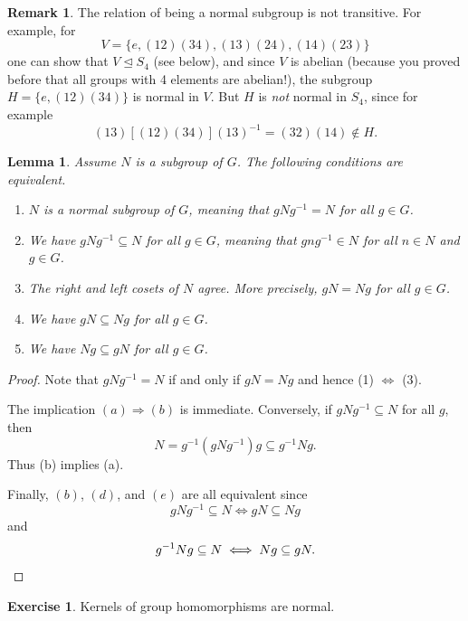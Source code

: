 \documentclass[12pt]{report}
\newtheorem{lemma}[theorem]{Lemma}
\numberwithin{equation}{section}
\numberwithin{theorem}{chapter}
\theoremstyle{definition}
\newtheorem{exercise}{Exercise}
\newtheorem*{basic properties}{Basic Properties}
\newtheorem*{Important Remark}{Important Remark}
\newtheorem{remark}[theorem]{Remark}
\def\norm{\mathrel{\unlhd}}
\begin{document}
\begin{remark}
The relation of being a normal subgroup is not transitive. For example, for 
$$V=\{e, (1 2)(3 4), (1 3)(2 4), (1 4)(2 3)\}$$ 
one can show that $V \norm S_4$ (see  below), and since $V$ is abelian (because you proved before that all groups with 4 elements are abelian!), the subgroup $H = \{e,(12)(34)\}$ is normal in $V$. But $H$ is {\em not} normal in $S_4$, since for example
$$(1 3) [(1 2)(3 4)] (1 3)^{-1} = (3 2)(1 4) \notin H.$$
\end{remark}


\newpage


\begin{lemma}\label{lem925}\label{normal subgroup equivs}
Assume $N$ is a subgroup of $G$. The following conditions are equivalent. 
\begin{enumerate}[label=(\alph*),leftmargin=20pt,itemsep=0.1em]
\item $N$ is a normal subgroup of $G$, meaning that $gNg^{-1} = N$ for all $g \in G$.
\item We have $gNg^{-1} \subseteq N$ for all $g \in G$, meaning that $gng^{-1} \in N$ for all $n \in N$ and $g \in G$.
\item The right and left cosets of $N$ agree. More precisely, $gN = Ng$ for all $g \in G$. 
\item We have $gN \subseteq Ng$ for all $g \in G$.
\item We have $Ng \subseteq gN$ for all $g \in G$.
\end{enumerate}
\end{lemma}



\begin{proof} 
Note that $gNg^{-1} = N$ if and only if $gN = Ng$ and hence (1) $\iff$ (3).
  
The implication $(a) \Rightarrow (b)$ is immediate. Conversely, if $gNg^{-1} \subseteq N$ for all $g$, then 
$$N = g^{-1}(gNg^{-1})g \subseteq g^{-1}Ng.$$ 
Thus (b) implies (a).

Finally, $(b)$, $(d)$, and $(e)$ are all equivalent since 
$$gNg^{-1} \subseteq N \iff gN \subseteq Ng$$
and
$$g^{-1}Ng \subseteq N \iff Ng \subseteq gN.\qedhere$$
\end{proof}

\begin{exercise}\label{kernel is a normal subgroup}
Kernels of group homomorphisms are normal.
\end{exercise}
\end{document}
